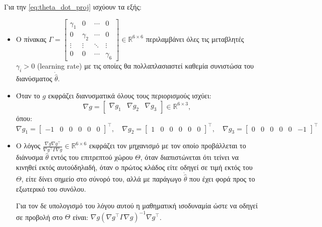 \documentclass[12pt]{article} %
\numberwithin{equation}{section}  %
\begin{document}
Για την \eqref{eq:theta_dot_proj} ισχύουν τα εξής:
\begin{itemize}[noitemsep, nolistsep]
    \item Ο πίνακας $\Gamma = \begin{bmatrix}
        \gamma_1 & 0        & \cdots & 0 \\
        0        & \gamma_2 & \cdots & 0 \\
        \vdots    & \vdots   & \ddots & \vdots \\
        0        & 0        & \cdots & \gamma_6
    \end{bmatrix} \in \mathbb{R}^{6 \times 6}$
    περιλαμβάνει όλες τις μεταβλητές $\gamma_i > 0$ (learning rate) με τις οποίες θα πολλαπλασιαστεί καθεμία συνιστώσα του διανύσματος $\dot{\hat{\theta}}$.

    \item Όταν το $g$ εκφράζει διανυσματικά όλους τους περιορισμούς ισχύει: 
        $$\nabla g = \begin{bmatrix}
            \nabla g_1 & \nabla g_2 & \nabla g_3
        \end{bmatrix}\in \mathbb{R}^{6 \times 3},$$
        όπου: 
        \begin{equation}\label{eq:grad_g}
            \nabla g_1 = \begin{bmatrix}
                -1 & 0 & 0 & 0 & 0 & 0
            \end{bmatrix}^{\top}, \quad 
            \nabla g_2 = \begin{bmatrix}
                1 & 0 & 0 & 0 & 0 & 0
            \end{bmatrix}^{\top}, \quad 
            \nabla g_3 = \begin{bmatrix}
                0 & 0 & 0 & 0 & 0 & -1
            \end{bmatrix}^{\top}
        \end{equation}

        \item Ο λόγος $\frac{\nabla g \nabla g^\top}{\nabla g^\top \Gamma \nabla g} \in \mathbb{R}^{6 \times 6}$ εκφράζει τον μηχανισμό με τον οποίο προβάλλεται το διάνυσμα $\hat{\theta}$ εντός του επιτρεπτού χώρου $\Theta$, όταν διαπιστώνεται ότι τείνει να κινηθεί εκτός αυτού\textemdash δηλαδή, όταν ο πρώτος κλάδος είτε οδηγεί σε τιμή εκτός του $\Theta$, είτε δίνει σημείο στο σύνορό του, αλλά με παράγωγο $\dot{\hat{\theta}}$ που έχει φορά προς το εξωτερικό του συνόλου.

        Για τον δε υπολογισμό του λόγου αυτού η μαθηματική ισοδυναμία ώστε να οδηγεί σε προβολή στο $\Theta$ είναι:  $\nabla g (\nabla g^\top \Gamma \nabla g)^{-1} \nabla g^\top$.


\end{itemize}
\end{document}
